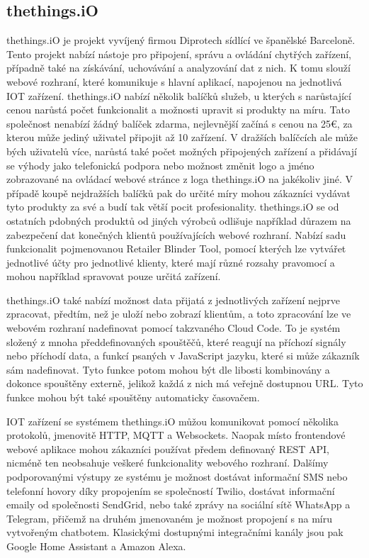 \subsection{thethings.iO}

thethings.iO je projekt vyvíjený firmou Diprotech sídlící ve španělské Barceloně. Tento projekt nabízí nástoje pro připojení, správu a ovládání chytřých zařízení, případně také na získávání, uchovávání a analyzování dat z nich. K tomu slouží webové rozhraní, které komunikuje s hlavní aplikací, napojenou na jednotlivá IOT zařízení. thethings.iO nabízí několik balíčků služeb, u kterých s narůstající cenou narůstá počet funkcionalit a možnosti upravit si produkty na míru. Tato společnost nenabízí žádný balíček zdarma, nejlevnější začíná s cenou na 25€, za kterou může jediný uživatel připojit až 10 zařízení. V dražších balíčcích ale může bých uživatelů více, narůstá také počet možných připojených zařízení a přidávají se výhody jako telefonická podpora nebo možnost změnit logo a jméno zobrazované na ovládací webové stránce z loga thethings.iO na jakékoliv jiné. V případě koupě nejdražších balíčků pak do určité míry mohou zákazníci vydávat tyto produkty za své a budí tak větší pocit profesionality. thethings.iO se od ostatních pdobných produktů od jiných výrobců odlišuje například důrazem na zabezpečení dat konečných klientů používajících webové rozhraní. Nabízí sadu funkcionalit pojmenovanou Retailer Blinder Tool, pomocí kterých lze vytvářet jednotlivé účty pro jednotlivé klienty, které mají různé rozsahy pravomocí a mohou například spravovat pouze určitá zařízení. 

thethings.iO také nabízí možnost data přijatá z jednotlivých zařízení nejprve zpracovat, předtím, než je uloží nebo zobrazí klientům, a toto zpracování lze ve webovém rozhraní nadefinovat pomocí takzvaného Cloud Code. To je systém složený z mnoha předdefinovaných spouštěčů, které reagují na příchozí signály nebo příchodí data, a funkcí psaných v JavaScript jazyku, které si může zákazník sám nadefinovat. Tyto funkce potom mohou být dle libosti kombinovány a dokonce spouštěny externě, jelikož každá z nich má veřejně dostupnou URL. Tyto funkce mohou být také spouštěny automaticky časovačem.

IOT zařízení se systémem thethings.iO můžou komunikovat pomocí několika protokolů, jmenovitě HTTP, MQTT a Websockets. Naopak místo frontendové webové aplikace mohou zákazníci používat předem definovaný REST API, nicméně ten neobsahuje veškeré funkcionality webového rozhraní. Dalšímy podporovanými výstupy ze systému je možnost dostávat informační SMS nebo telefonní hovory díky propojením se společností Twilio, dostávat informační emaily od společnosti SendGrid, nebo také zprávy na sociální sítě WhatsApp a Telegram, přičemž na druhém jmenovaném je možnost propojení s na míru vytvořeným chatbotem. Klasickými dostupnými integračními kanály jsou pak Google Home Assistant a Amazon Alexa.

